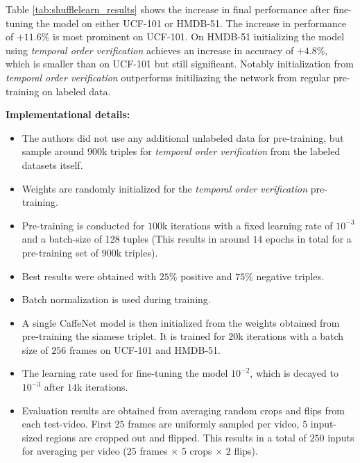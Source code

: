 Table \ref{tab:shufflelearn_results} shows the increase in final performance after fine-tuning the model on either UCF-101 or HMDB-51.
The increase in performance of $+11.6\%$ is most prominent on UCF-101.
On HMDB-51 initializing the model using \textit{temporal order verification} achieves an increase in accuracy of $+4.8\%$, which is smaller than on UCF-101 but still significant.
Notably initialization from \textit{temporal order verification} outperforms initiliazing the network from regular pre-training on labeled data.
\bigskip

\textbf{Implementational details:}\\
\begin{itemize}
    \item The authors did not use any additional unlabeled data for pre-training, but sample around $900$k triples for \textit{temporal order verification} from the labeled datasets itself.
    \item Weights are randomly initialized for the \textit{temporal order verification} pre-training. 
    \item Pre-training is conducted for $100$k iterations with a fixed learning rate of $10^{-3}$ and a batch-size of 128 tuples (This results in around $14$ epochs in total for a pre-training set of $900$k triples).
    \item Best results were obtained with $25\%$ positive and $75\%$ negative triples.
    \item Batch normalization \cite{ioffe_batch_2017} is used during training.
    \item A single CaffeNet model is then initialized from the weights obtained from pre-training the siamese triplet. It is trained for $20$k iterations with a batch size of $256$ frames on UCF-101 and HMDB-51.
    \item The learning rate used for fine-tuning the model $10^{-2}$, which is decayed to $10^{-3}$ after $14$k iterations.
    \item Evaluation results are obtained from averaging random crops and flips from each test-video. First $25$ frames are uniformly sampled per video, $5$ input-sized regions are cropped out and flipped. This results in a total of $250$ inputs for averaging per video ($25$ frames $\times$ $5$ crops $\times$ $2$ flips).
\end{itemize}
